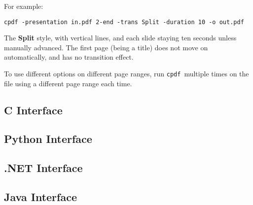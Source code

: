 \documentclass{book}
\newcommand{\cpdf}{\texttt{cpdf}}
\begin{document}
\noindent For example:
\begin{framed}
  \small
  \noindent\verb!cpdf -presentation in.pdf 2-end -trans Split -duration 10 -o out.pdf!

  \vspace{2.5mm}
  The \textbf{Split} style, with vertical lines, and each slide staying ten
seconds unless manually advanced. The first page (being a title) does not move
on automatically, and has no transition effect.

\end{framed}

\noindent To use different options on different page ranges, run \cpdf\ multiple times on
the file using a different page range each time.

\begin{cpdflib}
\clearpage
\section*{C Interface}
\begin{small}\tt

\end{small}
\end{cpdflib}

\begin{pycpdflib}
\clearpage
\section*{Python Interface}
\begin{small}\tt

\end{small}
\end{pycpdflib}

\begin{dotnetcpdflib}
\clearpage
\section*{.NET Interface}
\begin{small}\tt

\end{small}
\end{dotnetcpdflib}

\begin{jcpdflib}
\clearpage
\section*{Java Interface}
\begin{small}\tt

\end{small}
\end{jcpdflib}
\end{document}
